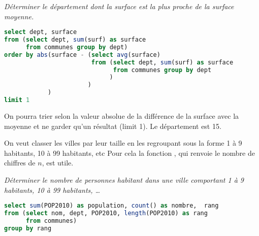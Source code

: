 \begin{Exercise}
\it Déterminer le département dont la surface est la plus proche de la surface moyenne.
\end{Exercise}
\begin{Answer}
\begin{lstlisting}[language=SQL]
select dept, surface
from (select dept, sum(surf) as surface 
      from communes group by dept)
order by abs(surface - (select avg(surface) 
                        from (select dept, sum(surf) as surface 
                              from communes group by dept
                             )
                       )
            )
limit 1		     
\end{lstlisting}
\end{Answer}
On pourra trier selon la valeur absolue de la différence de la surface avec la moyenne et ne garder qu'un résultat ({limit 1}).
Le département est 15.

\medskip
On veut classer les villes par leur taille en les regroupant sous la forme 1 à 9 habitants, 10 à 99 habitants, etc
Pour cela la fonction , qui renvoie le nombre de chiffres de $n$, est utile.
\begin{Exercise}
\it Déterminer le nombre de personnes habitant dans une ville comportant 1 à 9 habitants, 10 à 99 habitants, \dots
\end{Exercise}
\begin{Answer}
\begin{lstlisting}[language=SQL]
select sum(POP2010) as population, count() as nombre,  rang
from (select nom, dept, POP2010, length(POP2010) as rang
      from communes)
group by rang
\end{lstlisting}
\newpage
\end{Answer}
